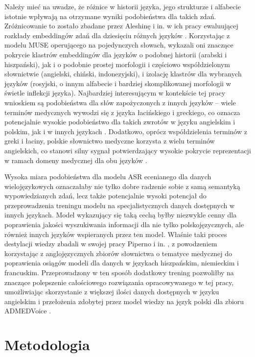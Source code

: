 Należy mieć na uwadze, że różnice w historii języka, jego strukturze i alfabecie istotnie wpływają na otrzymane wyniki podobieństwa dla takich zdań. Zróżnicowanie to zostało zbadane przez Aleshinę i in. w ich pracy ewaluującej rozkłady embeddingów zdań dla dziesięciu różnych języków \cite{multilanguageEmbeddingDifferences}. Korzystając z modelu MUSE \cite{museModel} operującego na pojedynczych słowach, wykazali oni znaczące pokrycie klastrów embeddingów dla języków o podobnej historii (arabski i hiszpański), jak i o podobnie prostej morfologii i częściowo współdzielonym słownictwie (angielski, chiński, indonezyjski), i izolację klastrów dla wybranych języków (rosyjski, o innym alfabecie i bardziej skomplikowanej morfologii w świetle inflekcji języka). Najbardziej interesującym w kontekście tej pracy wnioskiem są podobieństwa dla słów zapożyczonych z innych języków -- wiele terminów medycznych wywodzi się z języka łacińskiego i greckiego, co oznacza potencjalnie wysokie podobieństwo dla takich zwrotów w języku angielskim i polskim, jak i w innych językach \cite{latinMedical}. Dodatkowo, oprócz współdzielenia terminów z greki i łaciny, polskie słownictwo medyczne korzysta z wielu terminów angielskich, co stanowi silny sygnał potwierdzający wysokie pokrycie reprezentacji w ramach domeny medycznej dla obu języków \cite{medicalPolishEnglish}.

Wysoka miara podobieństwa dla modelu ASR ecenianego dla danych wielojęzykowych oznaczałaby nie tylko dobre radzenie sobie z samą semantyką wypowiedzianych zdań, lecz także potencjalnie wysoki potencjał do przeprowadzenia treningu modelu na specjalistycznych danych dostępnych w innych językach. Model wykazujący się taką cechą byłby niezwykle cenny dla poprawienia jakości wyszukiwania informacji dla nie tylko polskojęzycznych, ale również innych języków wspieranych przez ten model. Właśnie taki proces destylacji wiedzy zbadali w swojej pracy Piperno i in. \cite{multilingualDomainTranslation}, z powodzeniem korzystając z anglojęzycznych zbiorów słownictwa o tematyce medycznej do poprawienia osiągów modeli dla danych w językach hiszpańskim, niemieckim i francuskim. Przeprowadzony w ten sposób dodatkowy trening pozwoliłby na znaczące polepszenie całościowego rozwiązania opracowywanego w tej pracy, umożliwiając skorzystanie z większej ilości danych dostępnych w języku angielskim i przełożenia zdobytej przez model wiedzy na język polski dla zbioru ADMEDVoice \cite{ADMEDVoice}.


\section{Metodologia}
